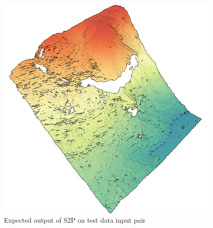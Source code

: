 \documentclass[paper=a4, fontsize=11pt, onecolumn, tikz, dvipsnames, svgnames, x11names]{article}
\begin{document}
\begin{figure}[H]
    \centering
    \includegraphics[height = 0.4\textheight]{elevation_intro.png}
    \caption{Expected output of S2P on test data input pair}
    \label{fig_expected_output_pair}
\end{figure}
\end{document}
